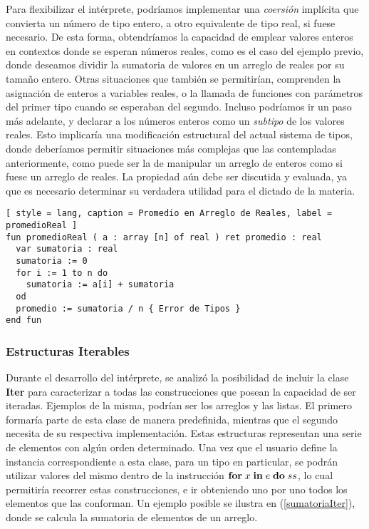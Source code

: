 Para flexibilizar el intérprete, podríamos implementar una \textit{coersión} implícita que convierta un número de tipo entero, a otro equivalente de tipo real, si fuese necesario.
De esta forma, obtendríamos la capacidad de emplear valores enteros en contextos donde se esperan números reales, como es el caso del ejemplo previo, donde deseamos dividir la sumatoria de valores en un arreglo de reales por su tamaño entero.
Otras situaciones que también se permitirían, comprenden la asignación de enteros a variables reales, o la llamada de funciones con parámetros del primer tipo cuando se esperaban del segundo.
Incluso podríamos ir un paso más adelante, y declarar a los números enteros como un \textit{subtipo} de los valores reales.
Esto implicaría una modificación estructural del actual sistema de tipos, donde deberíamos permitir situaciones más complejas que las contempladas anteriormente, como puede ser la de manipular un arreglo de enteros como si fuese un arreglo de reales.
La propiedad aún debe ser discutida y evaluada, ya que es necesario determinar su verdadera utilidad para el dictado de la materia.

\begin{lstlisting}[ style = lang, caption = Promedio en Arreglo de Reales, label = promedioReal ]
fun promedioReal ( a : array [n] of real ) ret promedio : real
  var sumatoria : real
  sumatoria := 0
  for i := 1 to n do
    sumatoria := a[i] + sumatoria
  od
  promedio := sumatoria / n { Error de Tipos }
end fun
\end{lstlisting}

\subsubsection{Estructuras Iterables}

Durante el desarrollo del intérprete, se analizó la posibilidad de incluir la clase \textbf{Iter} para caracterizar a todas las construcciones que posean la capacidad de ser iteradas.
Ejemplos de la misma, podrían ser los arreglos y las listas.
El primero formaría parte de esta clase de manera predefinida, mientras que el segundo necesita de su respectiva implementación.
Estas estructuras representan una serie de elementos con algún orden determinado.
Una vez que el usuario define la instancia correspondiente a esta clase, para un tipo en particular, se podrán utilizar valores del mismo dentro de la instrucción $\mathbf{for} \; x \; \mathbf{in} \; e \; \mathbf{do} \; ss$, lo cual permitiría recorrer estas construcciones, e ir obteniendo uno por uno todos los elementos que las conforman.
Un ejemplo posible se ilustra en (\ref{sumatoriaIter}), donde se calcula la sumatoria de elementos de un arreglo.


